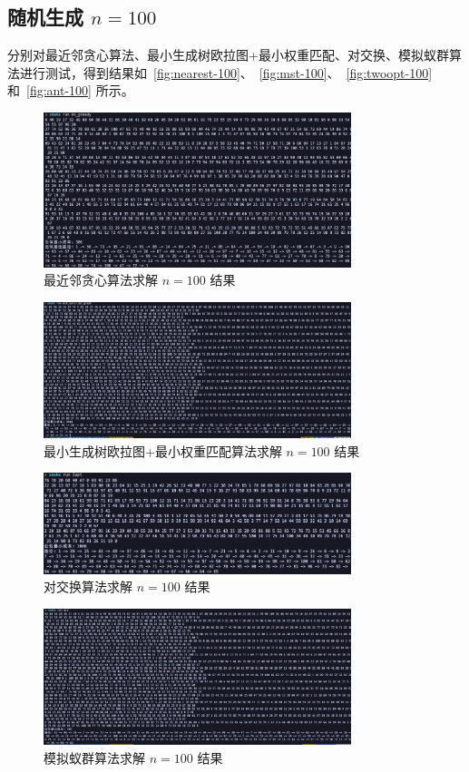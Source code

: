 \subsection{随机生成 $n=100$}
分别对最近邻贪心算法、最小生成树欧拉图+最小权重匹配、对交换、模拟蚁群算法进行测试，得到结果如~\autoref{fig:nearest-100}、~\autoref{fig:mst-100}、~\autoref{fig:twoopt-100} 和~\autoref{fig:ant-100} 所示。
\begin{figure}[htbp]
    \centering
    \includegraphics[width=0.8\textwidth]{images/greedy_100.png}
    \caption{最近邻贪心算法求解 $n=100$ 结果}
    \label{fig:nearest-100}
\end{figure}
\begin{figure}[htbp]
    \centering
    \includegraphics[width=0.8\textwidth]{images/mst_100.png}
    \caption{最小生成树欧拉图+最小权重匹配算法求解 $n=100$ 结果}
    \label{fig:mst-100}
\end{figure}
\begin{figure}[htbp]
    \centering
    \includegraphics[width=0.8\textwidth]{images/2opt_100.png}
    \caption{对交换算法求解 $n=100$ 结果}
    \label{fig:twoopt-100}
\end{figure}
\begin{figure}[htbp]
    \centering
    \includegraphics[width=0.8\textwidth]{images/aco_100.png}
    \caption{模拟蚁群算法求解 $n=100$ 结果}
    \label{fig:ant-100}
\end{figure}

